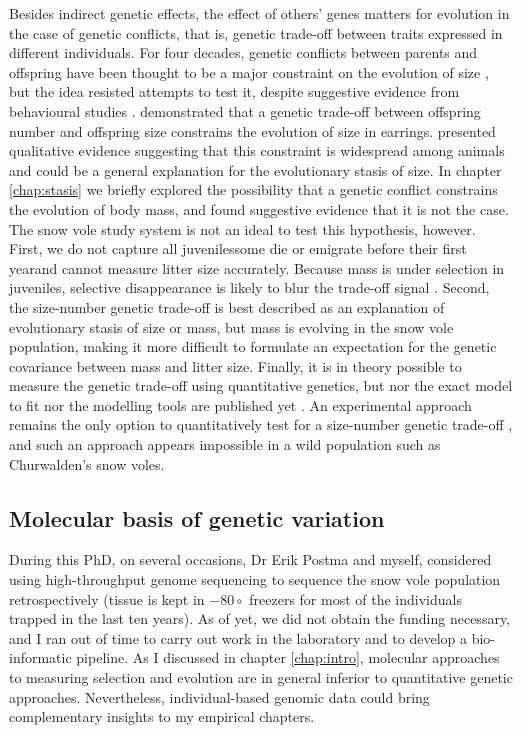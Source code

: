 Besides indirect genetic effects, the effect of others' genes matters for evolution in the case of genetic conflicts, that is, genetic trade-off between traits expressed in different individuals.
For four decades, genetic conflicts between parents and offspring have been thought to be a major constraint on the evolution of size \parencite[since][]{Trivers1974}, but the idea resisted attempts to test it, despite suggestive evidence from behavioural studies \parencite{Kolliker2015}. \cite{Kolliker2015} demonstrated that a genetic trade-off between offspring number and offspring size constrains the evolution of size in earrings. \cite{Rollinson2015b} presented qualitative evidence suggesting that this constraint is widespread among animals and could be a general explanation for the evolutionary stasis of size. 
In chapter \ref{chap:stasis} we briefly explored the possibility that a genetic conflict constrains the evolution of body mass, and found suggestive evidence that it is not the case. The snow vole study system is not an ideal to test this hypothesis, however. First, we do not capture all juveniles\textemdash some die or emigrate before their first year\textemdash and cannot measure litter size accurately. Because mass is under selection in juveniles,  selective disappearance is likely to blur the trade-off signal \parencite{Hadfield2011}. Second, the size-number genetic trade-off is best described as an explanation of evolutionary stasis of size or mass, but mass is evolving in the snow vole population, making it more difficult to formulate an expectation for the genetic covariance between mass and litter size. 
Finally, it is in theory possible to measure the genetic trade-off using quantitative genetics, but nor the exact model to fit nor the modelling tools are published yet \parencite{Hadfield2012, Rollinson2015b}. An experimental approach remains the only option to quantitatively test for a size-number genetic trade-off \parencite{Kolliker2015}, and such an approach appears impossible in a wild population such as Churwalden's snow voles. 

\subsection{Molecular basis of genetic variation}
During this PhD, on several occasions, Dr Erik Postma and myself, considered using high-throughput genome sequencing \parencite{VanDijk2014} to sequence the snow vole population retrospectively (tissue is kept in $-80\circ$ freezers for most of the individuals trapped in the last ten years).
As of yet, we did not obtain the funding necessary, and I ran out of time to carry out work in the laboratory and to develop a bio-informatic pipeline. 
As I discussed in chapter \ref{chap:intro}, molecular approaches to measuring selection and evolution are in general inferior to quantitative genetic approaches. Nevertheless, individual-based genomic data could bring complementary insights to my empirical chapters.

